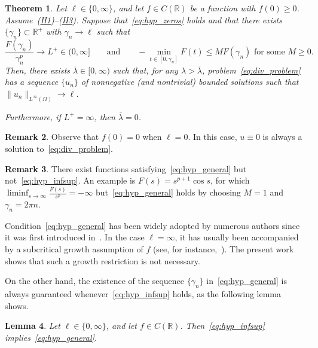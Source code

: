 \documentclass[10pt,twoside,english,reqno,a4paper]{amsart}
\theoremstyle{plain}
\theoremstyle{plain}
\newtheorem{theorem}{Theorem}[section]
\newtheorem{lemma}[theorem]{Lemma}
\theoremstyle{definition}
\newtheorem{remark}[theorem]{Remark}
\theoremstyle{remark}
\numberwithin{equation}{section}
\newcommand{\R}{\mathbb{R}}
\def\lio{{L^{\infty}(\Omega)}}
\newcommand{\oL}{L^+}
\begin{document}
\begin{theorem}
\label{th:General_Exist}
Let $\ell\in \{0,\infty\}$, and let $f\in C(\R)$ be a function with $f(0)\geq 0$. Assume~\textnormal{(\hyperlink{hyp:potential}{H1})--(\hyperlink{hyp:convex}{H3})}. Suppose that~\eqref{eq:hyp_zeros} holds and that there exists $\{\gamma_n\}\subset \R^+$ with $\gamma_n \to \ell$ such that
    \begin{equation}
    \label{eq:hyp_general}
        \frac{F(\gamma_n)}{\gamma_n^p} \to \oL\in (0,\infty] \qquad \text{and} \qquad  -\min_{t\in [0,\gamma_n]} F(t) \leq M F(\gamma_n) \text{ for some } M \geq 0.
    \end{equation}
Then, there exists $\overline{\lambda} \in [0,\infty)$ such that, for any $\lambda>\overline{\lambda}$, problem~\eqref{eq:div_problem} has a sequence $\{u_n\}$ of nonnegative (and nontrivial) bounded solutions such that $\|u_n\|_\lio \to \ell$.

Furthermore, if $\oL=\infty$, then $\overline{\lambda}=0$.
\end{theorem}

\begin{remark}
Observe that $f(0)=0$ when $\ell=0$. In this case, $u\equiv 0$ is always a solution to~\eqref{eq:div_problem}.
\end{remark}

\begin{remark}
There exist functions satisfying~\eqref{eq:hyp_general} but not~\eqref{eq:hyp_infsup}. An example is $F(s)=s^{p+1}\cos s$, for which $\liminf_{s\to \infty}\frac{F(s)}{s^p}=-\infty$ but~\eqref{eq:hyp_general} holds by choosing $M=1$ and $\gamma_n=2\pi n$.
\end{remark}

Condition~\eqref{eq:hyp_general} has been widely adopted by numerous authors since it was first introduced in~\cite{AC02}. In the case $\ell=\infty$, it has usually been accompanied by a subcritical growth assumption of $f$ (see, for instance,~\cite{MP14}). The present work shows that such a growth restriction is not necessary.

On the other hand, the existence of the sequence $\{\gamma_n\}$ in~\eqref{eq:hyp_general} is always guaranteed whenever~\eqref{eq:hyp_infsup} holds, as the following lemma shows.

\begin{lemma}
Let $\ell\in \{0,\infty\}$, and let $f\in C(\R)$. Then~\eqref{eq:hyp_infsup} implies~\eqref{eq:hyp_general}.
\end{lemma}
\end{document}
